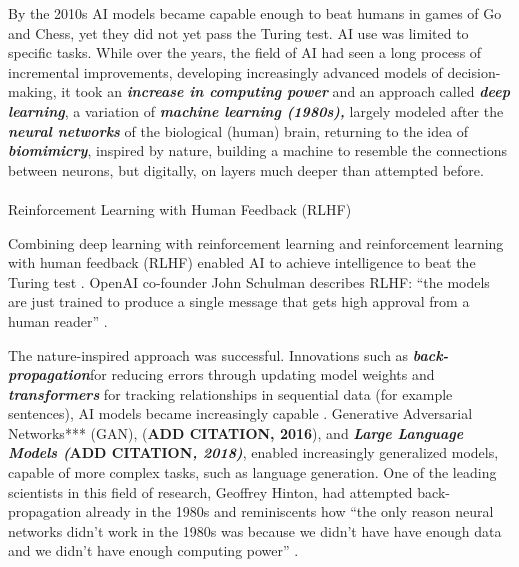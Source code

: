 \documentclass[
  letterpaper,
  DIV=11,
  numbers=noendperiod]{scrartcl}
\makeatletter
\let\oldparagraph\paragraph
\renewcommand{\paragraph}{
    \@ifstar
      \xxxParagraphStar
      \xxxParagraphNoStar
  }
\newcommand{\xxxParagraphStar}[1]{\oldparagraph*{#1}\mbox{}}
\newcommand{\xxxParagraphNoStar}[1]{\oldparagraph{#1}\mbox{}}
\makeatother
\begin{document}
By the 2010s AI models became capable enough to beat humans in games of
Go and Chess, yet they did not yet pass the Turing test. AI use was
limited to specific tasks. While over the years, the field of AI had
seen a long process of incremental improvements, developing increasingly
advanced models of decision-making, it took an \textbf{\emph{increase in
computing power}} and an approach called \textbf{\emph{deep learning}},
a variation of \textbf{\emph{machine learning (1980s),}} largely modeled
after the \textbf{\emph{neural networks}} of the biological (human)
brain, returning to the idea of \textbf{\emph{biomimicry}}, inspired by
nature, building a machine to resemble the connections between neurons,
but digitally, on layers much deeper than attempted before.

\paragraph{Reinforcement Learning with Human Feedback
(RLHF)}\label{reinforcement-learning-with-human-feedback-rlhf}

Combining deep learning with reinforcement learning and reinforcement
learning with human feedback (RLHF) enabled AI to achieve intelligence
to beat the Turing test
\citep{karamankeChatGPTArchitectBerkeley2022, christianoMyResearchMethodology2021, christianoDeepReinforcementLearning2017}.
OpenAI co-founder John Schulman describes RLHF: ``the models are just
trained to produce a single message that gets high approval from a human
reader'' \citep{karamankeChatGPTArchitectBerkeley2022}.

The nature-inspired approach was successful. Innovations such as
\textbf{\emph{back-propagation}}for reducing errors through updating
model weights and \textbf{\emph{transformers}} for tracking
relationships in sequential data (for example sentences), AI models
became increasingly capable
\citep{vaswaniAttentionAllYou2017, merrittWhatTransformerModel2022}.
Generative Adversarial Networks*** (GAN), (\textbf{ADD CITATION, 2016}),
and \textbf{\emph{Large Language Models (}ADD CITATION\emph{, 2018)}},
enabled increasingly generalized models, capable of more complex tasks,
such as language generation. One of the leading scientists in this field
of research, Geoffrey Hinton, had attempted back-propagation already in
the 1980s and reminiscents how ``the only reason neural networks didn't
work in the 1980s was because we didn't have have enough data and we
didn't have enough computing power''
\citep{cbsmorningsFullInterviewGodfather2023}.
\end{document}
